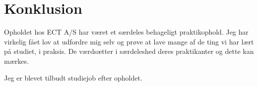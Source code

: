 \chapter{Konklusion}

Opholdet hos ECT A/S har været et særdeles behageligt praktikophold. Jeg har virkelig fået lov at udfordre mig selv og prøve at lave mange af de ting vi har lært på studiet, i praksis. De værdsætter i særdeleshed deres praktikanter og dette kan mærkes.

Jeg er blevet tilbudt studiejob efter opholdet.